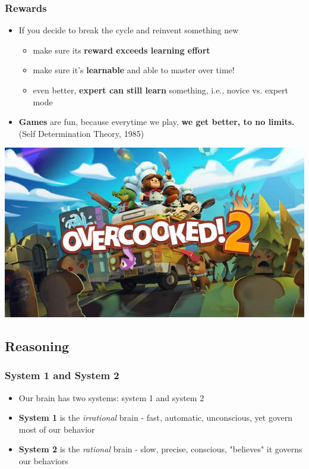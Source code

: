 \documentclass{beamer}
\begin{document}
\begin{frame}
	\frametitle{Rewards}
	\begin{itemize}
		\item If you decide to break the cycle and reinvent something new
		\begin{itemize}
			\item make sure its\textbf{ reward exceeds learning effort}
			\item make sure it's \textbf{learnable} and  able to master over time!
			\item even better, \textbf{expert can still learn} something, i.e., novice vs. expert mode
		\end{itemize}
		\item \textbf{Games} are  fun, because everytime we play, \textbf{we get better, to no limits.}   (Self Determination Theory, 1985)
	\end{itemize}
	\centering
	\includegraphics[width=0.5\linewidth]{image/game}
\end{frame}

\subsection{Reasoning}

\begin{frame}
	\frametitle{System 1 and System 2}
	\begin{itemize}
		\item Our brain has two systems: system 1 and system 2
		\item \textbf{System 1} is the \textit{irrational} brain - fast, automatic, unconscious, yet govern most of our behavior
		\item \textbf{System 2} is the \textit{rational} brain - slow, precise, conscious, "believes" it governs our behaviors
	\end{itemize}
\end{frame}
\end{document}

